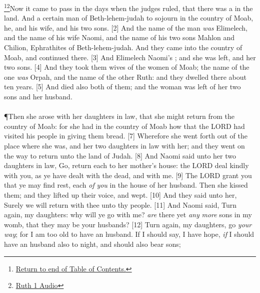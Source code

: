 \footnote{\textcolor[cmyk]{0.99998,1,0,0}{\hyperlink{TOC}{Return to end of Table of Contents.}}}\footnote{\href{https://audiobible.com/bible/ruth_1.html}{\textcolor[cmyk]{0.99998,1,0,0}{Ruth 1 Audio}}}\textcolor[cmyk]{0.99998,1,0,0}{Now it came to pass in the days when the judges ruled, that there was a  in the land. And a certain man of Beth-lehem-judah  to sojourn in the country of Moab, he, and his wife, and his two sons.}
[2] \textcolor[cmyk]{0.99998,1,0,0}{And the name of the man \emph{was} Elimelech, and the name of his wife Naomi, and the name of his two sons Mahlon and Chilion, Ephrathites of Beth-lehem-judah. And they came into the country of Moab, and continued there.}
[3] \textcolor[cmyk]{0.99998,1,0,0}{And Elimelech Naomi's ; and she was left, and her two sons.}
[4] \textcolor[cmyk]{0.99998,1,0,0}{And they took them wives of the women of Moab; the name of the one \emph{was} Orpah, and the name of the other Ruth: and they dwelled there about ten years.}
[5] \textcolor[cmyk]{0.99998,1,0,0}{And  died also both of them; and the woman was left of her two sons and her husband.}\\
\\
\P \textcolor[cmyk]{0.99998,1,0,0}{Then she arose with her daughters in law, that she might return from the country of Moab: for she had  in the country of Moab how that the LORD had visited his people in giving them bread.}
[7] \textcolor[cmyk]{0.99998,1,0,0}{Wherefore she went forth out of the place where she was, and her two daughters in law with her; and they went on the way to return unto the land of Judah.}
[8] \textcolor[cmyk]{0.99998,1,0,0}{And Naomi said unto her two daughters in law, Go, return each to her mother's house: the LORD deal kindly with you, as ye have dealt with the dead, and with me.}
[9] \textcolor[cmyk]{0.99998,1,0,0}{The LORD grant you that ye may find rest, each \emph{of} \emph{you} in the house of her husband. Then she kissed them; and they lifted up their voice, and wept.}
[10] \textcolor[cmyk]{0.99998,1,0,0}{And they said unto her, Surely we will return with thee unto thy people.}
[11] \textcolor[cmyk]{0.99998,1,0,0}{And Naomi said, Turn again, my daughters: why will ye go with me? \emph{are} there yet \emph{any} \emph{more} sons in my womb, that they may be your husbands?}
[12] \textcolor[cmyk]{0.99998,1,0,0}{Turn again, my daughters, go \emph{your} \emph{way}; for I am too old to have an husband. If I should say, I have hope, \emph{if} I should have an husband also to night, and should also bear sons;}
